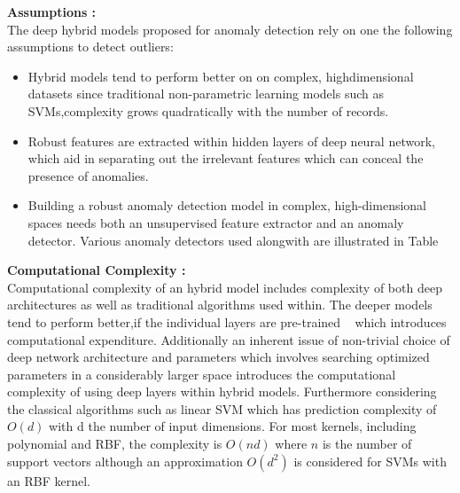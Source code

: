 \textbf{Assumptions : } \\
The deep hybrid models proposed for anomaly detection rely on one the following assumptions to detect outliers:
\begin{itemize}
 \item  Hybrid models tend to perform better on on complex, highdimensional datasets since traditional non-parametric learning models such as SVMs,complexity grows quadratically with the number of records.
  \item Robust features are extracted within hidden layers of deep neural network, which aid in separating out the irrelevant features which can conceal the presence of anomalies.
  \item Building a robust anomaly detection model in complex, high-dimensional spaces needs both an unsupervised feature extractor and an anomaly detector. Various anomaly detectors used alongwith are illustrated in Table ~\cite{tab:hybridModels}
\end{itemize}

\textbf{Computational Complexity :} \\
Computational complexity of an hybrid model includes complexity of both deep architectures as well as traditional algorithms used within. The deeper models tend to perform better,if the individual layers are pre-trained ~\cite{saxe2011random} which introduces computational expenditure. Additionally  an inherent issue of non-trivial choice of deep network architecture and parameters which involves searching optimized parameters in a considerably larger space introduces the computational complexity of using deep layers within hybrid models. Furthermore considering the classical algorithms such as  linear SVM which has prediction complexity  of $O(d)$ with d the number of input dimensions. For most kernels, including polynomial and RBF, the complexity is $O(nd)$ where $n$ is the number of support vectors although an approximation $O(d^2)$ is considered for SVMs with an RBF kernel.

